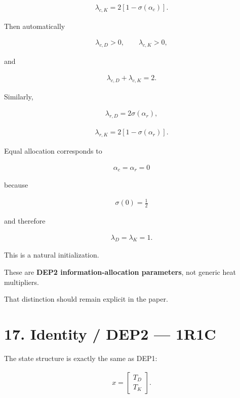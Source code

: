 \documentclass[11pt]{article}
\begin{document}
\begin{align}
\boxed{
\lambda_{c,K}=2[1-\sigma(\alpha_c)].
}
\tag{55}
\end{align}

Then automatically

\begin{align}
\lambda_{c,D}>0,
\qquad
\lambda_{c,K}>0,
\end{align}

and

\begin{align}
\lambda_{c,D}+\lambda_{c,K}=2.
\end{align}

Similarly,

\begin{align}
\boxed{
\lambda_{r,D}=2\sigma(\alpha_r),
}
\tag{56}
\end{align}

\begin{align}
\boxed{
\lambda_{r,K}=2[1-\sigma(\alpha_r)].
}
\tag{57}
\end{align}

Equal allocation corresponds to

\begin{align}
\alpha_c=\alpha_r=0
\end{align}

because

\begin{align}
\sigma(0)=\frac12
\end{align}

and therefore

\begin{align}
\lambda_D=\lambda_K=1.
\end{align}

This is a natural initialization.

These are \textbf{DEP2 information-allocation parameters}, not generic heat multipliers.

That distinction should remain explicit in the paper.

\section*{17. Identity / DEP2 --- 1R1C}

The state structure is exactly the same as DEP1:

\begin{align}
x=
\begin{bmatrix}
T_D\\T_K
\end{bmatrix}.
\end{align}
\end{document}
